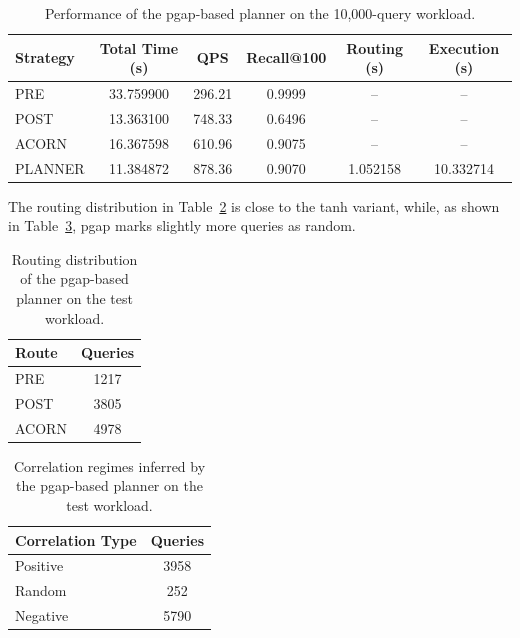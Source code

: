\begin{table}[H]
    \centering
    \renewcommand{\arraystretch}{1.15}
    \begin{tabular}{lccccc}
        \toprule
        Strategy & Total Time (s) & QPS & Recall@100 & Routing (s) & Execution (s) \\
        \midrule
        PRE     & 33.759900 & 296.21 & 0.9999 & --       & --        \\
        POST    & 13.363100 & 748.33 & 0.6496 & --       & --        \\
        ACORN   & 16.367598 & 610.96 & 0.9075 & --       & --        \\
        PLANNER & 11.384872 & 878.36 & 0.9070 & 1.052158 & 10.332714 \\
        \bottomrule
    \end{tabular}
    \caption{Performance of the pgap-based planner on the 10{,}000-query workload.}
    \label{tab:test-set-pgap}
\end{table}

The routing distribution in Table~\ref{tab:test-set-pgap-routing} is close to the tanh variant, while, as shown in Table~\ref{tab:test-set-pgap-correlation}, pgap marks slightly more queries as random. 

\begin{table}[H]
    \centering
    \renewcommand{\arraystretch}{1.15}
    \begin{tabular}{lc}
        \toprule
        Route & Queries \\
        \midrule
        PRE   & 1217 \\
        POST  & 3805 \\
        ACORN & 4978 \\
        \bottomrule
    \end{tabular}
    \caption{Routing distribution of the pgap-based planner on the test workload.}
    \label{tab:test-set-pgap-routing}
\end{table}

\begin{table}[H]
    \centering
    \renewcommand{\arraystretch}{1.15}
    \begin{tabular}{lc}
        \toprule
        Correlation Type & Queries \\
        \midrule
        Positive & 3958 \\
        Random   & 252  \\
        Negative & 5790 \\
        \bottomrule
    \end{tabular}
    \caption{Correlation regimes inferred by the pgap-based planner on the test workload.}
    \label{tab:test-set-pgap-correlation}
\end{table}

